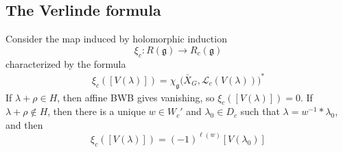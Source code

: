 \documentclass[12pt]{article}
\begin{document}
\subsection{The Verlinde formula}

Consider the map induced by holomorphic induction
\[
\xi_c:R(\mathfrak g)\to R_c(\mathfrak g)
\] characterized by the formula \begin{align*}
    \xi_c([V(\lambda)])
=
\chi_{\mathfrak g}\bigl(\bar X_G,\mathcal L_c(V(\lambda))\bigr)^*
\end{align*}
If $\lambda+\rho\in H$, then affine BWB gives vanishing, so
$\xi_c([V(\lambda)])=0$. If $\lambda+\rho\notin H$, then there is a unique $w\in W_c'$ and $\lambda_0\in D_c$ such that
$\lambda = w^{-1}*\lambda_0$,
and then
\[\xi_c([V(\lambda)]) = (-1)^{\ell(w)}[V(\lambda_0)]\]
\end{document}
